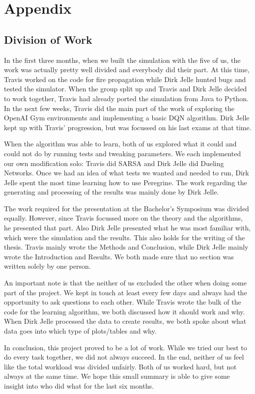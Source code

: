 
\clearpage
\section*{Appendix}
\subsection*{Division of Work}\label{sec:division}

In the first three months, when we built the simulation with the five of us, the work was actually pretty well divided and everybody did their part. At this time, Travis worked on the code for fire propagation while Dirk Jelle hunted bugs and tested the simulator. When the group split up and Travis and Dirk Jelle decided to work together, Travis had already ported the simulation from Java to Python. In the next few weeks, Travis did the main part of the work of exploring the OpenAI Gym environments and implementing a basic DQN algorithm. Dirk Jelle kept up with Travis' progression, but was focussed on his last exams at that time.

When the algorithm was able to learn, both of us explored what it could and could not do by running tests and tweaking parameters. We each implemented our own modification solo: Travis did SARSA and Dirk Jelle did Dueling Networks. Once we had an idea of what tests we wanted and needed to run, Dirk Jelle spent the most time learning how to use Peregrine. The work regarding the generating and processing of the results was mainly done by Dirk Jelle.

The work required for the presentation at the Bachelor's Symposium was divided equally. However, since Travis focussed more on the theory and the algorithms, he presented that part. Also Dirk Jelle presented what he was most familiar with, which were the simulation and the results. This also holds for the writing of the thesis. Travis mainly wrote the Methods and Conclusion, while Dirk Jelle mainly wrote the Introduction and Results. We both made sure that no section was written solely by one person.

An important note is that the neither of us excluded the other when doing some part of the project. We kept in touch at least every few days and always had the opportunity to ask questions to each other. While Travis wrote the bulk of the code for the learning algorithm, we both discussed how it should work and why. When Dirk Jelle processed the data to create results, we both spoke about what data goes into which type of plots/tables and why.

In conclusion, this project proved to be a lot of work. While we tried our best to do every task together, we did not always succeed. In the end, neither of us feel like the total workload was divided unfairly. Both of us worked hard, but not always at the same time. We hope this small summary is able to give some insight into who did what for the last six months.
